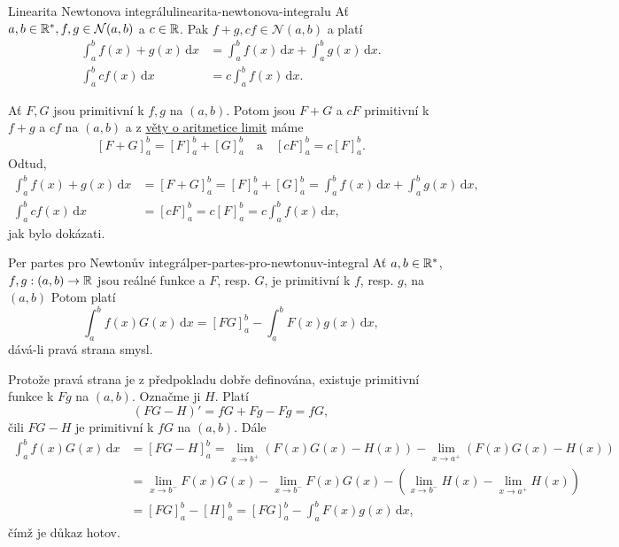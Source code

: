 \begin{theorem}{Linearita Newtonova integrálu}{linearita-newtonova-integralu}
 Ať $a,b \in \mathbb{R}^{*}, f,g \in \mathcal{N}(a,b)$ a $c \in \mathbb{R}$. Pak $f + g, cf \in
 \mathcal{N}(a,b)$ a platí
 \begin{align*}
  \int_{a}^{b} f(x) + g(x) \, \mathrm{d}x &= \int_{a}^{b} f(x) \, \mathrm{d}x +
  \int_{a}^{b} g(x) \, \mathrm{d}x.\\
  \int_{a}^{b} cf(x) \, \mathrm{d}x &= c \int_{a}^{b} f(x) \, \mathrm{d}x.
 \end{align*}
\end{theorem}
\begin{thmproof}
 Ať $F,G$ jsou primitivní k $f,g$ na $(a,b)$. Potom jsou $F + G$ a $cF$
 primitivní k $f + g$ a $cf$ na $(a,b)$ a z
 \hyperref[thm:aritmetika-limit-funkci]{věty o aritmetice limit} máme
 \[
  [F + G]_a^{b} = [F]_a^{b} + [G]_a^{b} \quad \text{a} \quad [cF]_a^{b} =
  c[F]_a^{b}.
 \]
 Odtud,
 \begin{align*}
  \int_{a}^{b} f(x) + g(x) \, \mathrm{d}x 
  &= [F + G]_a^{b} = [F]_a^{b} + [G]_a^{b} = \int_{a}^{b} f(x) \, \mathrm{d}x +
  \int_{a}^{b} g(x) \, \mathrm{d}x,\\
  \int_{a}^{b} cf(x) \, \mathrm{d}x 
  &= [cF]_a^{b} = c[F]_a^{b} = c \int_{a}^{b} f(x) \, \mathrm{d}x,
 \end{align*}
 jak bylo dokázati.
\end{thmproof}

\begin{theorem}{Per partes pro Newtonův integrál}{per-partes-pro-newtonuv-integral}
 Ať $a,b \in \mathbb{R}^{*}$, $f,g:(a,b) \to \mathbb{R}$ jsou reálné funkce a $F$, resp. $G$, je
 primitivní k $f$, resp. $g$, na $(a,b)$ Potom platí
 \[
  \int_{a}^{b} f(x)G(x) \, \mathrm{d}x = [FG]_{a}^{b} - \int_{a}^{b} F(x)g(x) \,
  \mathrm{d}x,
 \]
 dává-li pravá strana smysl.
\end{theorem}
\begin{thmproof}
 Protože pravá strana je z předpokladu dobře definována, existuje primitivní
 funkce k $Fg$ na $(a,b)$. Označme ji $H$. Platí
 \[
  (FG - H)' = fG + Fg - Fg = fG,
 \]
 čili $FG - H$ je primitivní k $fG$ na $(a,b)$. Dále
 \begin{align*}
  \int_{a}^{b} f(x)G(x) \, \mathrm{d}x
  &= [FG - H]_a^{b} = \lim_{x \to b^{+}} (F(x)G(x) - H(x)) - \lim_{x \to a^{+}}
  (F(x)G(x) - H(x))\\
  &= \lim_{x \to b^{-}} F(x)G(x) - \lim_{x \to b^{-}} F(x)G(x) - (\lim_{x \to
  b^{-}} H(x) - \lim_{x \to a^{+}} H(x))\\
  &= [FG]_a^{b} - [H]_a^{b} = [FG]_a^{b} - \int_{a}^{b} F(x)g(x) \,
  \mathrm{d}x,
 \end{align*}
 čímž je důkaz hotov.
\end{thmproof}

